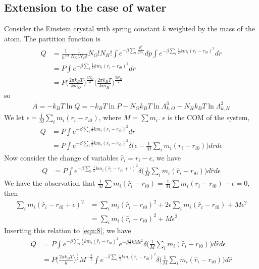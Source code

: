\documentclass[aps,pre,a4paper,showkeys,fleqn]{revtex4}
\begin{document}
\subsection{Extension to the case of water}
Consider the Einstein crystal with spring constant $k$ weighted by the mass of the atom.
The partition function is
\begin{align*}
  Q & =
      \frac{1}{h^{3N}}
      \frac{1}{N_O!N_H!} N_O!N_H!
      \int e^{-\beta\sum_i\frac{p_i^2}{2m_i}} dp
      \int e^{-\beta\sum_i \frac 12km_i(r_i - r_{i0})^2} dr \\
    &=
      P \int e^{-\beta\sum_i \frac 12km_i(r_i - r_{i0})^2} dr \\
    &=
      P
      \Big( \frac{2\pi k_BT}{km_O} \Big)^{\frac{3N_O}2}
      \Big( \frac{2\pi k_BT}{km_H} \Big)^{\frac{3N_H}2}
\end{align*}
so
\begin{align*}
  A = -k_BT \ln Q = -k_BT \ln P
  - N_Ok_BT\ln\Lambda_{k,O}^3
  - N_Hk_BT\ln\Lambda_{k,H}^3
\end{align*}
We let $\epsilon = \frac1M \sum_i m_i(r_i - r_{i0})$, where $M = \sum m_i$. $\epsilon$ is the COM of the system,
\begin{align*}
  Q & =
      P \int e^{-\beta\sum_i \frac 12km_i(r_i - r_{i0})^2} dr \\
    & =
      P \int e^{-\beta\sum_i \frac 12km_i(r_i - r_{i0})^2}
      \delta\big( \epsilon - \frac1M \sum_i m_i (r_i - r_{i0}) \big) dr d\epsilon
\end{align*}
Now consider the change of variables $\hat r_i = r_i - \epsilon$, we have
\begin{align}\label{eqn:8}
  Q & =
      P \int e^{-\beta\sum_i \frac 12km_i(\hat r_i - r_{i0} + \epsilon)^2}
      \delta\big( \frac1M \sum_im_i(\hat r_i - r_{i0}) \big) d\hat r d\epsilon
\end{align}
We have the observation that $ \frac 1M \sum m_i(\hat r_i  - r_{i0}) = \frac 1M \sum m_i( r_i  - r_{i0}) - \epsilon = 0$, then
\begin{align*}
  \sum_i m_i(\hat r_i - r_{i0} + \epsilon)^2
  &=
    \sum_i m_i(\hat r_i - r_{i0})^2 + 2\epsilon\sum_im_i (\hat r_i - r_{i0}) + M\epsilon^2 \\
  &=
    \sum_i m_i(\hat r_i - r_{i0})^2 + M\epsilon^2
\end{align*}
Inserting this relation to \eqref{eqn:8}, we have
\begin{align}\nonumber
  Q
  & =
    P \int e^{-\beta\sum_i \frac 12km_i(\hat r_i - r_{i0})^2} e^{-\beta \frac12 kM \epsilon^2}
    \delta\big( \frac1M \sum_i m_i(\hat r_i - r_{i0}) \big) d\hat r d\epsilon \\
  &=
    P \Big( \frac{2\pi k_BT}k  \Big)^{\frac32} M^{-\frac32}
    \int e^{-\beta\sum_i \frac 12km_i(\hat r_i - r_{i0})^2}
    \delta\big( \frac1M \sum_im_i(\hat r_i - r_{i0}) \big) d\hat r
\end{align}
\end{document}
